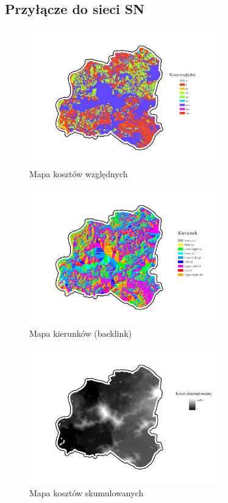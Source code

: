 \documentclass{article}
\begin{document}
\subsection{Przyłącze do sieci SN}
\begin{figure}[H]
    \centering
    \includegraphics[width=0.75\textwidth]{img/plesna-cost-raster.jpg}
    \caption*{Mapa kosztów względnych}
\end{figure}

\begin{figure}[H]
    \centering
    \includegraphics[width=0.75\textwidth]{img/plesna-cost-backlink.jpg}
    \caption*{Mapa kierunków (backlink)}
\end{figure}

\begin{figure}[H]
    \centering
    \includegraphics[width=0.75\textwidth]{img/plesna-cost-distance.jpg}
    \caption*{Mapa kosztów skumulowanych}
\end{figure}
\end{document}
